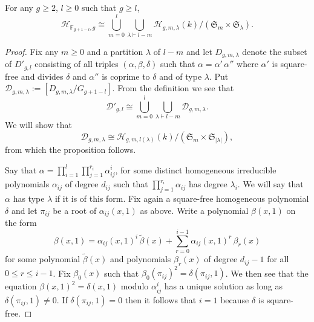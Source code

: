 \documentclass[10pt,a4paper]{amsart}
\begin{document}
\begin{prop} \label{prop-moduli} For any $g \geq 2$, $l \geq 0$ such that $g \geq l$, 
\begin{equation}\label{eq3}
    \mathcal{H}_{\mathbb{F}_{g+1-l},g} \cong \bigcup_{m=0}^l \bigcup_{\lambda \vdash l-m} \mathcal H_{g,m,\lambda}(k)/(\mathfrak S_m \times \mathfrak S_{\lambda}).
\end{equation}
\end{prop}

\begin{proof}

Fix any $m \geq 0$ and a partition $\lambda$ of $l-m$ and let $D_{g,m,\lambda}$ denote the subset of $D'_{g,l}$ consisting of all triples $(\alpha,\beta,\delta)$ such that $\alpha=\alpha' \, \alpha''$ where $\alpha'$ is square-free and divides $\delta$ and $\alpha''$ is coprime to $\delta$ and of type $\lambda$. Put $\mathcal{D}_{g,m,\lambda}:=[D_{g,m,\lambda}/G_{g+1-l}]$. From the definition we see that 
\[
\mathcal{D}'_{g,l} \cong \bigcup_{m=0}^l \bigcup_{\lambda \vdash l-m} \mathcal{D}_{g,m,\lambda}.
\]
We will show that 
\begin{equation}\label{eq2}
    \mathcal{D}_{g,m,\lambda} \cong \mathcal H_{g,m,l(\lambda)}(k)/(\mathfrak S_m \times \mathfrak S_{|\lambda|}),
\end{equation}
from which the proposition follows. 

Say that $\alpha=\prod_{i=1}^l \prod_{j=1}^{r_i} \alpha_{ij}^i$, for some distinct homogeneous irreducible polynomials $\alpha_{ij}$ of degree $d_{ij}$ such that $\prod_{j=1}^{r_i} \alpha_{ij}$ has degree $\lambda_i$. We will say that $\alpha$ has type $\lambda$ if it is of this form. Fix again a square-free homogeneous polynomial $\delta$ and let $\pi_{ij}$ be a root of $\alpha_{ij}(x,1)$ as above. Write a polynomial $\beta(x,1)$ on the form 
\[
\beta(x,1)=\alpha_{ij}(x,1)^i\, \tilde \beta(x)+\sum_{r=0}^{i-1} \alpha_{ij}(x,1)^r \, \beta_r(x)  
\]
for some polynomial $\tilde \beta(x)$ and polynomials $\beta_r(x)$ of degree $d_{ij}-1$ for all $0 \leq r \leq i-1$. Fix $\beta_0(x)$ such that $\beta_0(\pi_{ij})^2=\delta(\pi_{ij},1)$. We then see that the equation $\beta(x,1)^2=\delta(x,1)$ modulo $\alpha_{ij}^i$ has a unique solution as long as $\delta(\pi_{ij},1) \neq 0$. If $\delta(\pi_{ij},1)=0$ then it follows that $i=1$ because $\delta$ is square-free. 
\end{proof}
\end{document}
